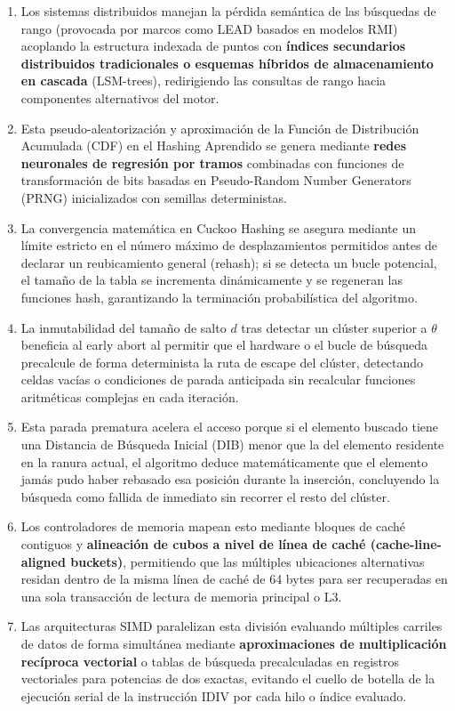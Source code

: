 \documentclass[12pt,a4paper]{report}
\begin{document}
\begin{enumerate}
    \item Los sistemas distribuidos manejan la pérdida semántica de las búsquedas de rango (provocada por marcos como LEAD basados en modelos RMI) acoplando la estructura indexada de puntos con \textbf{índices secundarios distribuidos tradicionales o esquemas híbridos de almacenamiento en cascada} (LSM-trees), redirigiendo las consultas de rango hacia componentes alternativos del motor.
    \item Esta pseudo-aleatorización y aproximación de la Función de Distribución Acumulada (CDF) en el Hashing Aprendido se genera mediante \textbf{redes neuronales de regresión por tramos} combinadas con funciones de transformación de bits basadas en Pseudo-Random Number Generators (PRNG) inicializados con semillas deterministas.
    \item La convergencia matemática en Cuckoo Hashing se asegura mediante un límite estricto en el número máximo de desplazamientos permitidos antes de declarar un reubicamiento general (rehash); si se detecta un bucle potencial, el tamaño de la tabla se incrementa dinámicamente y se regeneran las funciones hash, garantizando la terminación probabilística del algoritmo.
    \item La inmutabilidad del tamaño de salto $d$ tras detectar un clúster superior a $\theta$ beneficia al early abort al permitir que el hardware o el bucle de búsqueda precalcule de forma determinista la ruta de escape del clúster, detectando celdas vacías o condiciones de parada anticipada sin recalcular funciones aritméticas complejas en cada iteración.
    \item Esta parada prematura acelera el acceso porque si el elemento buscado tiene una Distancia de Búsqueda Inicial (DIB) menor que la del elemento residente en la ranura actual, el algoritmo deduce matemáticamente que el elemento jamás pudo haber rebasado esa posición durante la inserción, concluyendo la búsqueda como fallida de inmediato sin recorrer el resto del clúster.
    \item Los controladores de memoria mapean esto mediante bloques de caché contiguos y \textbf{alineación de cubos a nivel de línea de caché (cache-line-aligned buckets)}, permitiendo que las múltiples ubicaciones alternativas residan dentro de la misma línea de caché de 64 bytes para ser recuperadas en una sola transacción de lectura de memoria principal o L3.
    \item Las arquitecturas SIMD paralelizan esta división evaluando múltiples carriles de datos de forma simultánea mediante \textbf{aproximaciones de multiplicación recíproca vectorial} o tablas de búsqueda precalculadas en registros vectoriales para potencias de dos exactas, evitando el cuello de botella de la ejecución serial de la instrucción IDIV por cada hilo o índice evaluado.
\end{enumerate}
\end{document}
